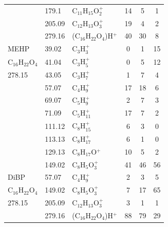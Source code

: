 {{\begin{longtable}[c]{lllccc}
                                                         & 179.1  & C$_{11}$H$_{15}$O$_2^+$    & 14 & 5  & 1  \\
                                                         & 205.09 & C$_{12}$H$_{13}$O$_3^+$    & 19 & 4  & 2  \\
                                                         & 279.16 & (C$_{16}$H$_{22}$O$_4$)H$^+$ & 40 & 30 & 8 \\
\hline
MEHP                                                     & 39.02  & C$_3$H$_3^+$                   & 0  & 1  & 15 \\
C$_{16}$H$_{22}$O$_4$ & 41.04  & C$_3$H$_5^+$                   & 0  & 5  & 12 \\
278.15                                                   & 43.05  & C$_3$H$_7^+$                   & 1  & 7  & 4  \\
                                                         & 57.07  & C$_4$H$_9^+$                   & 17 & 18 & 6  \\
                                                         & 69.07  & C$_5$H$_9^+$                   & 2  & 7  & 3  \\
                                                         & 71.09  & C$_5$H$_{11}^+$                  & 17 & 7  & 2  \\
                                                         & 111.12 & C$_8$H$_{15}^+$                  & 6  & 3  & 0  \\
                                                         & 113.13 & C$_8$H$_{17}^+$                  & 6  & 1  & 0  \\
                                                         & 129.13 & C$_8$H$_{17}$O$^+$                 & 10 & 5  & 2  \\
                                                         & 149.02 & C$_8$H$_5$O$_3^+$ & 41 & 46 & 56 \\
\hline
DiBP      & 57.07                & C$_4$H$_9^+$                           & 2            & 3            & 5            \\
C$_{16}$H$_{22}$O$_4$          & 149.02               & C$_8$H$_5$O$_3^+$      & 7            & 17           & 65           \\
278.15          & 205.09               & C$_{12}$H$_{13}$O$_3^+$    & 3            & 1            & 1            \\
          & 279.16               & (C$_{16}$H$_{22}$O$_4$)H$^+$ & 88           & 79           & 29           \\

\end{longtable}}}
